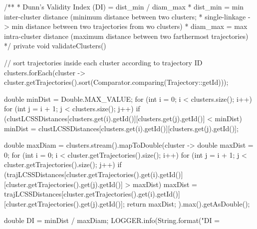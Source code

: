 /**
 * Dunn's Validity Index (DI) = dist_min / diam_max
 * dist_min = min inter-cluster distance (minimum distance between two clusters;
 * single-linkage -> min distance between two trajectories from wo clusters)
 * diam_max = max intra-cluster distance (maximum distance between two farthermost trajectories)
 */
private void validateClusters() {
	// sort trajectories inside each cluster according to trajectory ID
    clusters.forEach(cluster ->
    		cluster.getTrajectories().sort(Comparator.comparing(Trajectory::getId)));

    double minDist = Double.MAX_VALUE;
    for (int i = 0; i < clusters.size(); i++) {
        for (int j = i + 1; j < clusters.size(); j++) {
            if (clustLCSSDistances[clusters.get(i).getId()][clusters.get(j).getId()] < minDist)
                minDist = clustLCSSDistances[clusters.get(i).getId()][clusters.get(j).getId()];
        }
    }

    double maxDiam = clusters.stream().mapToDouble(cluster -> {
        double maxDist = 0;
        for (int i = 0; i < cluster.getTrajectories().size(); i++) {
            for (int j = i + 1; j < cluster.getTrajectories().size(); j++) {
                if (trajLCSSDistances[cluster.getTrajectories().get(i).getId()][cluster.getTrajectories().get(j).getId()] > maxDist)
                    maxDist = trajLCSSDistances[cluster.getTrajectories().get(i).getId()][cluster.getTrajectories().get(j).getId()];
            }
        }
        return maxDist;
    }).max().getAsDouble();

    double DI = minDist / maxDiam;
    LOGGER.info(String.format("DI = %
}